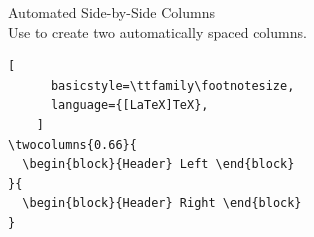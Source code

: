 \documentclass[aspectratio=169,12pt]{beamer}
\begin{document}
\begin{frame}[fragile]{Automated Side-by-Side Columns }
  \\
  Use  to create two automatically spaced columns.

  \smallskip
  \smallskip

  \medskip
  \begin{lstlisting}[
      basicstyle=\ttfamily\footnotesize,
      language={[LaTeX]TeX},
    ]
\twocolumns{0.66}{
  \begin{block}{Header} Left \end{block}
}{
  \begin{block}{Header} Right \end{block}
}
  \end{lstlisting}
\end{frame}
\end{document}
